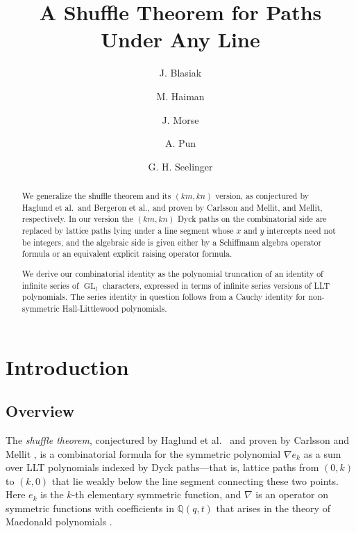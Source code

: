 \documentclass[12pt]{amsart}
\title{A Shuffle Theorem for Paths Under Any Line}
\author{J. Blasiak}
\author{M. Haiman}
\author{J. Morse}
\author{A. Pun}
\author{G. H. Seelinger}
\theoremstyle{definition}
\theoremstyle{remark}
\newcommand{\QQ}{{\mathbb Q}}
\DeclareMathOperator{\GL}{GL}
\begin{document}

\begin{abstract}
We generalize the shuffle theorem and its $(km,kn)$ version, as
conjectured by Haglund et al.\ and Bergeron et al., and proven by
Carlsson and Mellit, and Mellit, respectively. In our version
the $(km,kn)$ Dyck paths on the combinatorial side are replaced by
lattice paths lying under a line segment whose $x$ and $y$ intercepts
need not be integers, and the algebraic side is given either by a
Schiffmann algebra operator formula or an equivalent explicit raising
operator formula.

We derive our combinatorial identity as the polynomial truncation of
an identity of infinite series of $\GL_{l}$ characters, expressed in
terms of infinite series versions of LLT polynomials.  The series
identity in question follows from a Cauchy identity for non-symmetric
Hall-Littlewood polynomials.
\end{abstract}

\maketitle

\section{Introduction}
\label{s:intro}

\subsection{Overview} \label{ss:intro} The {\em shuffle theorem},
conjectured by Haglund et al.\ \cite{HaHaLoReUl05} and proven by
Carlsson and Mellit \cite{CarlMell18}, is a combinatorial formula for
the symmetric polynomial $\nabla e_{k}$ as a sum over LLT polynomials
indexed by Dyck paths---that is, lattice paths from $(0,k)$ to $(k,0)$
that lie weakly below the line segment connecting these two points.
Here $e_{k}$ is the $k$-th elementary symmetric function, and $\nabla
$ is an operator on symmetric functions with coefficients in $\QQ
(q,t)$ that arises in the theory of Macdonald polynomials
\cite{BeGaHaTe99}.
\end{document}
